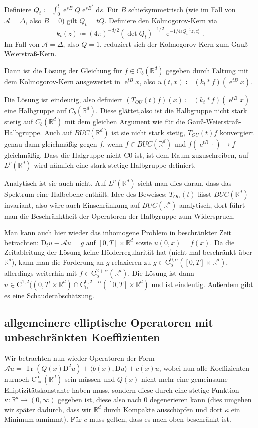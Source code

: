 \documentclass[11pt,a4paper]{scrartcl}
\newcommand{\R}{\mathbb{R}} %
\newcommand{\A}{\mathcal{A}}
\newcommand{\Cb}{\mathrm{C}_\mathrm{b}}
\theoremstyle{plain}
\theoremstyle{definition}
\theoremstyle{remark}
\DeclareMathOperator{\Tr}{Tr}
\DeclareMathOperator{\e}{e}
\begin{document}
Definiere $Q_t\coloneqq \int_0^t \e^{sB}Q\e^{sB^*}\mathrm{d}s$. Für $B$ schiefsymmetrisch (wie im Fall von $\A=\Delta$, also $B=0$) gilt $Q_t=tQ$. Definiere den Kolmogorov-Kern via $$k_t(z)\coloneqq (4\pi)^{-d/2}(\det Q_t)^{-1/2} \e^{-1/4\langle Q_t^{-1}z, z\rangle}.$$ Im Fall von $\A=\Delta$, also $Q=1$, reduziert sich der Kolmogorov-Kern zum Gauß-Weierstraß-Kern.

Dann ist die Lösung der Gleichung für $f\in C_b(\R^d)$ gegeben durch Faltung mit dem Kolmogorov-Kern ausgewertet in $\e^{tB}x$, also $u(t,x)\coloneqq (k_t\ast f)(\e^{tB}x)$.

Die Lösung ist eindeutig, also definiert $(T_{OU}(t)f)(x)\coloneqq (k_t\ast f)(\e^{tB}x)$ eine Halbgruppe auf $C_b(\R^d)$. Diese glättet,also ist die Halbgruppe nicht stark stetig auf $C_b(\R^d)$ mit dem gleichen Argument wie für die Gauß-Weierstraß-Halbgruppe. Auch auf $BUC(\R^d)$ ist sie nicht stark stetig, $T_{OU}(t)f$ konvergiert genau dann gleichmäßig gegen $f$, wenn $f\in BUC(\R^d)$ und $f(\e^{tB}\cdot)\to f$ gleichmäßig. Dass die Halgruppe nicht C0 ist, ist dem Raum zuzuschreiben, auf $L^p(\R^d)$ wird nämlich eine stark stetige Halbgruppe definiert.

Analytisch ist sie auch nicht. Auf $L^p(\R^d)$ sieht man dies daran, dass das Spektrum eine Halbebene enthält. Idee des Beweises: $T_{OU}(t)$ lässt $BUC(\R^d)$ invariant, also wäre auch Einschränkung auf $BUC(\R^d)$ analytisch, dort führt man die Beschränktheit der Operatoren der Halbgruppe zum Widerspruch.

Man kann auch hier wieder das inhomogene Problem in beschränkter Zeit betrachten: $\mathrm{D}_t u -\A u = g$ auf $[0,T]\times \R^d$ sowie $u(0,x)=f(x)$. Da die Zeitableitung der Lösung keine Hölderregularität hat (nicht mal beschränkt über $\R^d$), kann man die Forderung an $g$ relaxieren zu $g\in \Cb^{0,\alpha}([0,T]\times \R^d)$, allerdings weiterhin mit $f\in \Cb^{2+\alpha}(\R^d)$. Die Lösung ist dann $u\in \mathrm{C}^{1,2}((0,T]\times \R^d)\cap \Cb^{0,2+\alpha}([0,T]\times \R^d)$ und ist eindeutig. Außerdem gibt es eine Schauderabschätzung. 

\subsection{allgemeinere elliptische Operatoren mit unbeschränkten Koeffizienten}

Wir betrachten nun wieder Operatoren der Form $\A u = \Tr(Q(x)\mathrm{D}^2u)+\langle b(x), \mathrm{D}u\rangle + c(x)u$, wobei nun alle Koeffizienten nurnoch $\mathrm{C}_\mathrm{loc}^\alpha(\R^d)$ sein müssen und $Q(x)$ nicht mehr eine gemeinsame Elliptizitätskonstante haben muss, sondern diese durch eine stetige Funktion $\kappa: \R^d\to (0,\infty)$ gegeben ist, diese also nach $0$ degenerieren kann (dies umgehen wir später dadurch, dass wir $\R^d$ durch Kompakte ausschöpfen und dort $\kappa$ ein Minimum annimmt). Für $c$ muss gelten, dass es nach oben beschränkt ist. 
\end{document}
